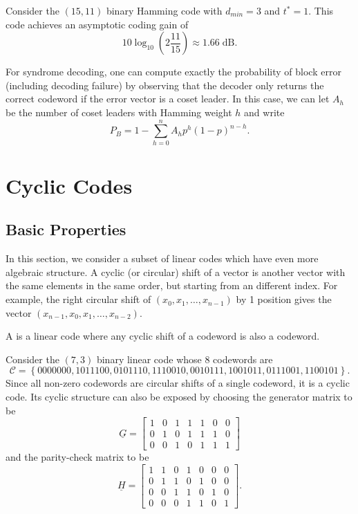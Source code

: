 \begin{example}
Consider the $(15,11)$ binary Hamming code with $d_{min} = 3$ and $t^* = 1$.
This code achieves an asymptotic coding gain of
\[ 10 \log_{10} \left( 2 \frac{11}{15} \right) \approx 1.66 \; \mathrm{dB}. \]
\end{example}

For syndrome decoding, one can compute exactly the probability of block error (including decoding failure) by observing that the decoder only returns the correct codeword if the error vector is a coset leader.
In this case, we can let $A_h$ be the number of coset leaders with Hamming weight $h$ and write
\[ P_{B} = 1-\sum_{h=0}^{n} A_h p^h (1-p)^{n-h}. \]

\section{Cyclic Codes}

\subsection{Basic Properties}
In this section, we consider a subset of linear codes which have even more algebraic structure.
A cyclic (or circular) shift of a vector is another vector with the same elements in the same order, but starting from an different index.
For example, the right circular shift of $(x_0,x_1,\ldots,x_{n-1})$ by 1 position gives the vector $(x_{n-1},x_0,x_1,\ldots,x_{n-2})$.

\begin{definition}
A  is a linear code where any cyclic shift of a codeword is also a codeword.
\end{definition}

\begin{example}
Consider the $(7,3)$ binary linear code whose 8 codewords are
\[ \mathcal{C} = \left\{
0000000,
1011100,
0101110,
1110010,
0010111,
1001011,
0111001,
1100101
\right\}. \]
Since all non-zero codewords are circular shifts of a single codeword, it is a cyclic code.
Its cyclic structure can also be exposed by choosing the generator matrix to be
\[ \underline{G} = \left[ \begin{array}{ccccccc}
1 & 0 & 1 & 1 & 1 & 0 & 0 \\
0 & 1 & 0 & 1 & 1 & 1 & 0 \\
0 & 0 & 1 & 0 & 1 & 1 & 1 \end{array} \right] \]
and the parity-check matrix to be
\[ \underline{H} = \left[ \begin{array}{ccccccc}
1 & 1 & 0 & 1 & 0 & 0 & 0 \\
0 & 1 & 1 & 0 & 1 & 0 & 0 \\
0 & 0 & 1 & 1 & 0 & 1 & 0 \\
0 & 0 & 0 & 1 & 1 & 0 & 1 \end{array} \right]. \]
\end{example}

